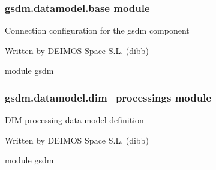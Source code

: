 \begin{fulllineitems}

\begin{fulllineitems}
\label{\detokenize{gsdm.datamodel:gsdm.datamodel.annotations.AnnotationTimestamp.parent_position}}
\end{fulllineitems}


\begin{fulllineitems}
\label{\detokenize{gsdm.datamodel:gsdm.datamodel.annotations.AnnotationTimestamp.value}}
\end{fulllineitems}


\end{fulllineitems}



\subsubsection{gsdm.datamodel.base module}
\label{\detokenize{gsdm.datamodel:module-gsdm.datamodel.base}}\label{\detokenize{gsdm.datamodel:gsdm-datamodel-base-module}}
Connection configuration for the gsdm component

Written by DEIMOS Space S.L. (dibb)

module gsdm


\subsubsection{gsdm.datamodel.dim\_processings module}
\label{\detokenize{gsdm.datamodel:module-gsdm.datamodel.dim_processings}}\label{\detokenize{gsdm.datamodel:gsdm-datamodel-dim-processings-module}}
DIM processing data model definition

Written by DEIMOS Space S.L. (dibb)

module gsdm

